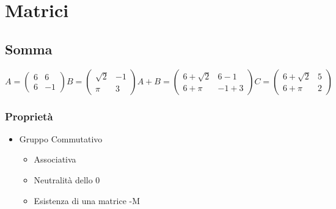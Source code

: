 \chapter{Matrici}
\label{Matrici} %
\section{Somma}

\begin{equation}
A = 
\begin{pmatrix}
6 & 6 \\
6 & -1
\end{pmatrix}
B = 
\begin{pmatrix}
\sqrt{2} & -1\\
\pi & 3
\end{pmatrix}
A+B = 
\begin{pmatrix}
6+\sqrt{2} & 6-1\\
6+\pi & -1+3
\end{pmatrix}
C = 
\begin{pmatrix}
6+\sqrt{2} & 5\\
6+\pi & 2
\end{pmatrix}
\end{equation}

\subsection{Proprietà}
\begin{itemize}
 \item Gruppo Commutativo
 \begin{itemize}
  \item Associativa
  \item Neutralità dello 0
  \item Esistenza di una matrice -M
 \end{itemize}
\end{itemize}
